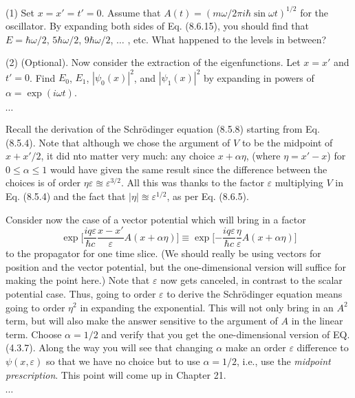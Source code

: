 \documentclass[../principles-of-quantum-mechanics.tex]{subfiles}
\begin{document}
\begin{questions}
		(1) Set $x = x' = t' = 0$. Assume that $A(t) = (m\omega/2\pi i \hbar \sin \omega t)^{1/2}$ for the oscillator. By expanding both sides of Eq. (8.6.15), you should find that $E = \hbar\omega/2$, $5\hbar\omega/2$, $9\hbar\omega/2$, $\ldots$ , etc. What happened to the levels in between?
		
		(2) (Optional). Now consider the extraction of the eigenfunctions. Let $x = x'$ and $t' = 0$. Find $E_0$, $E_1$, $|\psi_0(x)|^2$, and $|\psi_1(x)|^2$ by expanding in powers of $\alpha = \exp(i\omega t)$.
		\begin{solution}
			$\cdots$
		\end{solution}
		
		\question Recall the derivation of the Schr\"odinger equation (8.5.8) starting from Eq. (8.5.4). Note that although we chose the argument of $V$ to be the midpoint of $x + x'/2$, it did nto matter very much: any choice $x + \alpha\eta$, (where $\eta = x' - x$) for $0 \leq \alpha \leq 1$ would have given the same result since the difference between the choices is of order $\eta\varepsilon \approxeq \varepsilon^{3/2}$. All this was thanks to the factor $\varepsilon$ multiplying $V$ in Eq. (8.5.4) and the fact that $|\eta| \approxeq \varepsilon^{1/2}$, as per Eq. (8.6.5).
		
		Consider now the case of a vector potential which will bring in a factor
		$$\exp\Big[\frac{iq\varepsilon}{\hbar c}\frac{x - x'}{\varepsilon}A(x + \alpha\eta)\Big] \equiv \exp\Big[{-\frac{iq\varepsilon}{\hbar c}}\frac{\eta}{\varepsilon}A(x + \alpha\eta)\Big]$$
		to the propagator for one time slice. (We should really be using vectors for position and the vector potential, but the one-dimensional version will suffice for making the point here.) Note that $\varepsilon$ now gets canceled, in contrast to the scalar potential case. Thus, going to order $\varepsilon$ to derive the Schr\"odinger equation means going to order $\eta^2$ in expanding the exponential. This will not only bring in an $A^2$ term, but will also make the answer sensitive to the argument of $A$ in the linear term. Choose $\alpha = 1/2$ and verify that you get the one-dimensional version of EQ. (4.3.7). Along the way you will see that changing $\alpha$ make an order $\varepsilon$ difference to $\psi(x, \varepsilon)$ so that we have no choice but to use $\alpha = 1/2$, i.e., use the \textit{midpoint prescription}. This point will come up in Chapter 21.
		\begin{solution}
			$\cdots$
		\end{solution}
		
	\end{questions}
\end{document}
